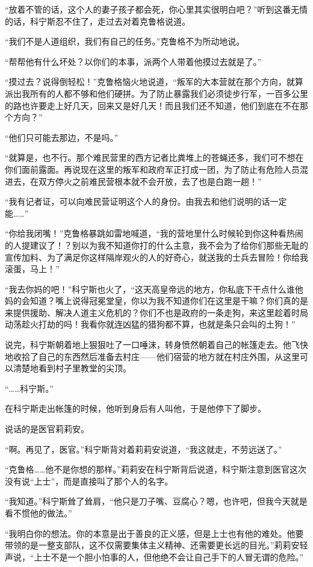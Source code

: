 “放着不管的话，这个人的妻子孩子都会死，你心里其实很明白吧？”听到这番无情的话，科宁斯忍不住了，走过去对着克鲁格说道。

“我们不是人道组织，我们有自己的任务。”克鲁格不为所动地说。

“帮帮他有什么坏处？以你们的本事，派两个人带着他摸过去就是了。”

“摸过去？说得倒轻松！”克鲁格恼火地说道，“叛军的大本营就在那个方向，就算派出我所有的人都不够和他们硬拼。为了防止暴露我们必须徒步行军，一百多公里的路也许要走上好几天，回来又是好几天！而且我们还不知道，他们到底在不在那个方向？”

“他们只可能去那边，不是吗。”

“就算是，也不行。那个难民营里的西方记者比粪堆上的苍蝇还多，我们可不想在你们面前露面。再说现在这里的叛军和政府军正打成一团，为了防止有危险人员混进去，在双方停火之前难民营根本就不会开放，去了也是白跑一趟！”

“我有记者证，可以向难民营证明这个人的身份。由我去和他们说明的话一定能……”

“你给我闭嘴！”克鲁格暴跳如雷地喊道，“我的营地里什么时候轮到你这种看热闹的人提建议了！？别以为我不知道你打的什么主意，我不会为了给你们那些无耻的宣传加料、为了满足你这样隔岸观火的人的好奇心，就送我的士兵去冒险！你给我滚蛋，马上！”

“我去你妈的吧！”科宁斯也火了，“这天高皇帝远的地方，你私底下干点什么谁他妈的会知道？嘴上说得冠冕堂皇，你以为我不知道你们在这里是干嘛？你们真的是来提供援助、解决人道主义危机的？你们不也是政府的一条走狗，来这里趁着时局动荡趁火打劫的吗！我看你就连凶猛的猎狗都不算，也就是条只会叫的土狗！”

说完，科宁斯朝着地上狠狠吐了一口唾沫，转身愤然朝着自己的帐篷走去。他飞快地收拾了自己的东西然后准备去村庄——他们宿营的地方就在村庄外围，从这里可以清楚地看到村子里教堂的尖顶。

“……科宁斯。”

在科宁斯走出帐篷的时候，他听到身后有人叫他，于是他停下了脚步。

说话的是医官莉莉安。

“啊。再见了，医官。”科宁斯背对着莉莉安说道，“我这就走，不劳远送了。”

“克鲁格……他不是你想的那样。”莉莉安在科宁斯背后说道，科宁斯注意到医官这次没有说“上士”，而是直接叫了那个人的名字。

“我知道。”科宁斯耸了耸肩，“他只是刀子嘴、豆腐心？嗯，也许吧，但我今天就是看不惯他的做法。”

“我明白你的想法。你的本意是出于善良的正义感，但是上士也有他的难处。他要带领的是一整支部队，这不仅需要集体主义精神、还需要更长远的目光。”莉莉安轻声说，“上士不是一个胆小怕事的人，但他绝不会让自己手下的人冒无谓的危险。”

